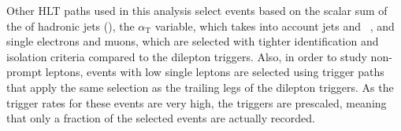 Other HLT paths used in this analysis select events based on the scalar sum of the \pt of hadronic jets (\HT), the $\alpha_{\mathrm{T}}$ variable, which takes into account jets and \MET~\cite{Khachatryan2011196}, and single electrons and muons, which are selected with tighter identification and isolation criteria compared to the dilepton triggers. Also, in order to study non-prompt leptons, events with low \pt single leptons are selected using trigger paths that apply the same selection as the trailing legs of the dilepton triggers. As the trigger rates for these events are very high, the triggers are prescaled, meaning that only a fraction of the selected events are actually recorded.

  


